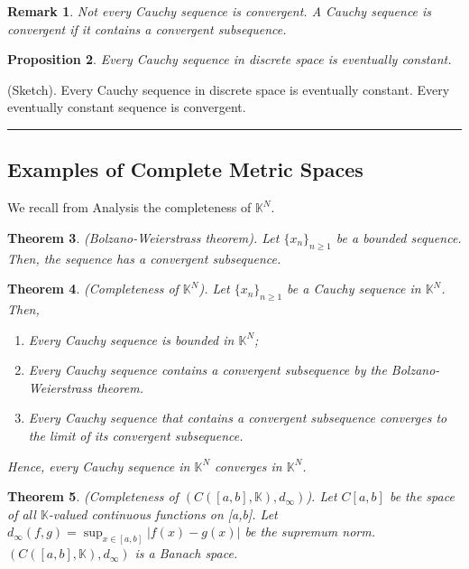 \documentclass[twoside]{article}
\newcounter{lecnum}
\newtheorem{theorem}{Theorem}[lecnum]
\newtheorem{proposition}[theorem]{Proposition}
\newtheorem{remark}[theorem]{Remark}
\newenvironment{proof}{{\bf Proof:}}{\hfill\rule{2mm}{2mm}}
\begin{document}
\begin{remark} Not every Cauchy sequence is convergent. A Cauchy sequence is convergent if it contains a convergent subsequence.
\end{remark}

\begin{proposition}Every Cauchy sequence in discrete space is eventually constant.
\end{proposition}

\begin{proof}(Sketch). Every Cauchy sequence in discrete space is eventually constant. Every eventually constant sequence is convergent.
\end{proof}

\subsection{Examples of Complete Metric Spaces}

We recall from Analysis the completeness of $\mathbb{K}^N$.

\begin{theorem}(Bolzano-Weierstrass theorem). Let $\{x_n\}_{n \geq 1}$ be a bounded sequence. Then, the sequence has a convergent subsequence.
\end{theorem}

\begin{theorem}(Completeness of $\mathbb{K}^N$). Let $\{x_n\}_{n \geq 1}$ be a Cauchy sequence in $\mathbb{K}^N$. Then,
\begin{enumerate}
\item Every Cauchy sequence is bounded in $\mathbb{K}^N$;
\item Every Cauchy sequence contains a convergent subsequence by the Bolzano-Weierstrass theorem.
\item Every Cauchy sequence that contains a convergent subsequence converges to the limit of its convergent subsequence.
\end{enumerate}
Hence, every Cauchy sequence in $\mathbb{K}^N$ converges in $\mathbb{K}^N$.
\end{theorem}

\begin{theorem}(Completeness of $(C([a,b],\mathbb{K}),d_{\infty})$). Let $C[a,b]$ be the space of all $\mathbb{K}$-valued continuous functions on [a,b]. Let $d_{\infty}(f,g) = \sup_{x \in [a,b]}|f(x) - g(x)|$ be the supremum norm.\\ $(C([a,b],\mathbb{K}),d_{\infty})$ is a Banach space.
\end{theorem}
\end{document}

